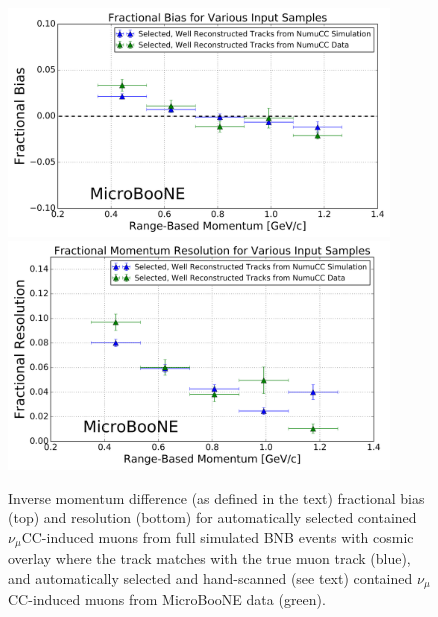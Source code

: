 \documentclass[a4paper,11pt]{article}
\begin{document}



\begin{figure}
\centering
	\includegraphics[width=0.9\textwidth]{Figures/MCS_range_bias_multiplesamples_publicplot.png}
	\includegraphics[width=0.9\textwidth]{Figures/MCS_range_resolution_multiplesamples_publicplot.png}
\caption{Inverse momentum difference (as defined in the text) fractional bias (top) and resolution (bottom) for automatically selected contained $\nu_\mu$CC-induced muons from full simulated BNB events with cosmic overlay where the track matches with the true muon track (blue), and automatically selected and hand-scanned (see text) contained $\nu_\mu$CC-induced muons from MicroBooNE data (green).}\label{MCS_range_bias_resolution_DataRecoTrack_fig}
\end{figure}
\end{document}
